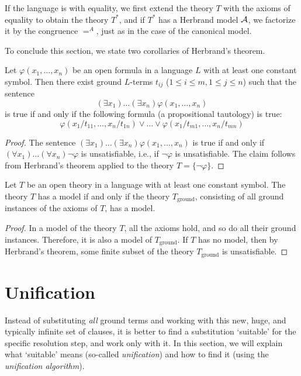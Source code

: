\begin{remark}
If the language is with equality, we first extend the theory $T$ with the axioms of equality to obtain the theory $T^*$, and if $T^*$ has a Herbrand model $\mathcal{A}$, we factorize it by the congruence $=^A$, just as in the case of the canonical model.
\end{remark}

To conclude this section, we state two corollaries of Herbrand's theorem.

\begin{corollary}
    Let $\varphi(x_1,\dots,x_n)$ be an open formula in a language $L$ with at least one constant symbol. Then there exist ground $L$-terms $t_{ij}$ ($1\leq i\leq m,1\leq j\leq n$) such that the sentence 
    $$
    (\exists x_1)\dots(\exists x_n)\varphi(x_1,\dots,x_n)$$ 
    is true if and only if the following formula (a propositional tautology) is true:
    $$
    \varphi(x_1/t_{11},\dots,x_n/t_{1n})\lor \dots \lor \varphi(x_1/t_{m1},\dots,x_n/t_{mn})
    $$
\end{corollary}
\begin{proof}
The sentence $(\exists x_1)\dots(\exists x_n)\varphi(x_1,\dots,x_n)$ is true if and only if $(\forall x_1)\dots(\forall x_n)\neg\varphi$ is unsatisfiable, i.e., if $\neg\varphi$ is unsatisfiable. The claim follows from Herbrand's theorem applied to the theory $T=\{\neg\varphi\}$.
\end{proof}

\begin{corollary}\label{corollary:herbrands-theorem-corollary-ground}
    Let $T$ be an open theory in a language with at least one constant symbol. The theory $T$ has a model if and only if the theory $T_\text{ground}$, consisting of all ground instances of the axioms of $T$, has a model.
\end{corollary}
\begin{proof}
In a model of the theory $T$, all the axioms hold, and so do all their ground instances. Therefore, it is also a model of $T_\text{ground}$. If $T$ has no model, then by Herbrand's theorem, some finite subset of the theory $T_\text{ground}$ is unsatisfiable.
\end{proof}


\section{Unification}\label{section:unification}

Instead of substituting \emph{all} ground terms and working with this new, huge, and typically infinite set of clauses, it is better to find a substitution `suitable' for the specific resolution step, and work only with it. In this section, we will explain what `suitable' means (so-called \emph{unification}) and how to find it (using the \emph{unification algorithm}).

